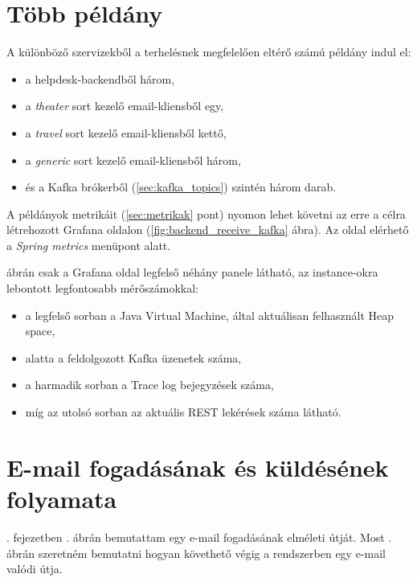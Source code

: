 \section{Több példány}
A különböző szervizekből a terhelésnek megfelelően eltérő számú példány indul el:

\begin{itemize}
	\item a helpdesk-backendből három,
	\item a \textit{theater} sort kezelő email-kliensből egy,
	\item a \textit{travel} sort kezelő email-kliensből kettő,
	\item a \textit{generic} sort kezelő email-kliensből három,
	\item és a Kafka brókerből (\ref{sec:kafka_topics}) szintén három darab.
\end{itemize}

A példányok metrikáit (\ref{sec:metrikak} pont) nyomon lehet követni az erre a célra létrehozott Grafana oldalon (\ref{fig:backend_receive_kafka} ábra). Az oldal elérhető a  \textit{Spring metrics} menüpont alatt.

 ábrán csak a Grafana oldal legfelső néhány panele látható, az instance-okra lebontott legfontosabb mérőszámokkal:

\begin{itemize}
	\item a legfelső sorban a Java Virtual Machine, által aktuálisan felhasznált Heap space,	
	\item alatta a feldolgozott Kafka üzenetek száma,
	\item a harmadik sorban a Trace log bejegyzések száma,
	\item míg az utolsó sorban az aktuális REST lekérések száma látható.
\end{itemize}



\section{E-mail fogadásának és küldésének folyamata}
. fejezetben . ábrán bemutattam egy e-mail fogadásának elméleti útját. Most . ábrán szeretném bemutatni hogyan követhető végig a rendszerben egy e-mail valódi útja.

